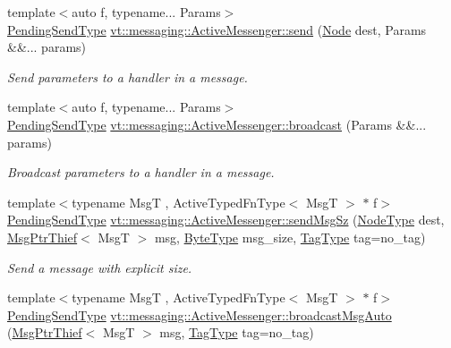 \begin{DoxyCompactItemize}
{\footnotesize template$<$auto f, typename... Params$>$ }\\\hyperlink{structvt_1_1messaging_1_1_active_messenger_a3626a6ca76d8ad4ec7c3b47a2c70d3a8}{Pending\+Send\+Type} \hyperlink{group__typesafehan_ga4557b5ce74c8c5df0013cf49738517bf}{vt\+::messaging\+::\+Active\+Messenger\+::send} (\hyperlink{namespacevt_a04777c732e1a2b2c317995af9972b999}{Node} dest, Params \&\&... params)
\begin{DoxyCompactList}\small\item\em Send parameters to a handler in a message. \end{DoxyCompactList}\item 
{\footnotesize template$<$auto f, typename... Params$>$ }\\\hyperlink{structvt_1_1messaging_1_1_active_messenger_a3626a6ca76d8ad4ec7c3b47a2c70d3a8}{Pending\+Send\+Type} \hyperlink{group__typesafehan_ga058d20ece0e732645bc62d6a448abe76}{vt\+::messaging\+::\+Active\+Messenger\+::broadcast} (Params \&\&... params)
\begin{DoxyCompactList}\small\item\em Broadcast parameters to a handler in a message. \end{DoxyCompactList}\item 
{\footnotesize template$<$typename MsgT , Active\+Typed\+Fn\+Type$<$ Msg\+T $>$ $\ast$ f$>$ }\\\hyperlink{structvt_1_1messaging_1_1_active_messenger_a3626a6ca76d8ad4ec7c3b47a2c70d3a8}{Pending\+Send\+Type} \hyperlink{group__typesafehan_gaf93d1ac24a1d7a7aa820e67a89551bf8}{vt\+::messaging\+::\+Active\+Messenger\+::send\+Msg\+Sz} (\hyperlink{namespacevt_a866da9d0efc19c0a1ce79e9e492f47e2}{Node\+Type} dest, \hyperlink{structvt_1_1messaging_1_1_msg_ptr_thief}{Msg\+Ptr\+Thief}$<$ MsgT $>$ msg, \hyperlink{namespacevt_aab8d55968084610ce3b17057981e9300}{Byte\+Type} msg\+\_\+size, \hyperlink{namespacevt_a84ab281dae04a52a4b243d6bf62d0e52}{Tag\+Type} tag=no\+\_\+tag)
\begin{DoxyCompactList}\small\item\em Send a message with explicit size. \end{DoxyCompactList}\item 
{\footnotesize template$<$typename MsgT , Active\+Typed\+Fn\+Type$<$ Msg\+T $>$ $\ast$ f$>$ }\\\hyperlink{structvt_1_1messaging_1_1_active_messenger_a3626a6ca76d8ad4ec7c3b47a2c70d3a8}{Pending\+Send\+Type} \hyperlink{group__typesafehan_ga7a5d96676fde771a9ce5af119796fb3a}{vt\+::messaging\+::\+Active\+Messenger\+::broadcast\+Msg\+Auto} (\hyperlink{structvt_1_1messaging_1_1_msg_ptr_thief}{Msg\+Ptr\+Thief}$<$ MsgT $>$ msg, \hyperlink{namespacevt_a84ab281dae04a52a4b243d6bf62d0e52}{Tag\+Type} tag=no\+\_\+tag)

\end{DoxyCompactItemize}

